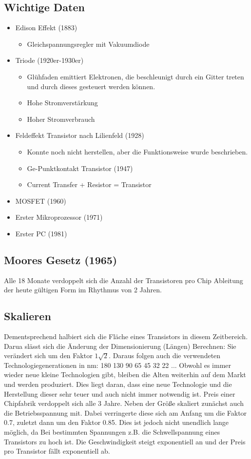 \subsection{Wichtige Daten}
\begin{itemize}
	\item Edison Effekt (1883)
	\begin{itemize}
		\item Gleichspannungsregler mit Vakuumdiode
	\end{itemize}
	\item Triode (1920er-1930er)
	\begin{itemize}
		\item Glühfaden emittiert Elektronen, die beschleunigt durch ein Gitter treten und durch dieses gesteuert werden können.
		\item Hohe Stromverstärkung
		\item Hoher Stromverbrauch
	\end{itemize}
	\item Feldeffekt Transistor nach Lilienfeld (1928)
	\begin{itemize}
		\item Konnte noch nicht herstellen, aber die Funktionsweise wurde beschrieben.
		\item Ge-Punktkontakt Transistor (1947)
		\item Current Transfer + Resistor = Transistor
	\end{itemize}
	\item MOSFET (1960)
	\item Erster Mikroprozessor (1971)
	\item Erster PC (1981)
\end{itemize}

\subsection{Moores Gesetz (1965)}
Alle 18 Monate verdoppelt sich die Anzahl der Transistoren pro Chip
Ableitung der heute gültigen Form im Rhythmus von 2 Jahren.

\subsection{Skalieren}
Dementsprechend halbiert sich die Fläche eines Transistors in diesem Zeitbereich. Darua slässt sich die Änderung der Dimensionierung (Längen) Berechnen: Sie verändert sich um den Faktor $1 \sqrt{2}$.
Daraus folgen auch die verwendeten Technologiegenerationen in nm: 180 130 90 65 45 32 22 ...
Obwohl es immer wieder neue kleine Technologien gibt, bleiben die Alten weiterhin auf dem Markt und werden produziert. Dies liegt daran, dass eine neue Technologie und die Herstellung dieser sehr teuer und auch nicht immer notwendig ist. Preis einer Chipfabrik verdoppelt sich alle 3 Jahre.
Neben der Größe skaliert zunächst auch die Betriebsspannung mit. Dabei verringerte diese sich am Anfang um die Faktor 0.7, zuletzt dann um den Faktor 0.85. Dies ist jedoch nicht unendlich lange möglich, da Bei bestimmten Spannungen z.B. die Schwellspannung eines Transistors zu hoch ist. 
Die Geschwindigkeit steigt exponentiell an und der Preis pro Transistor fällt exponentiell ab.

